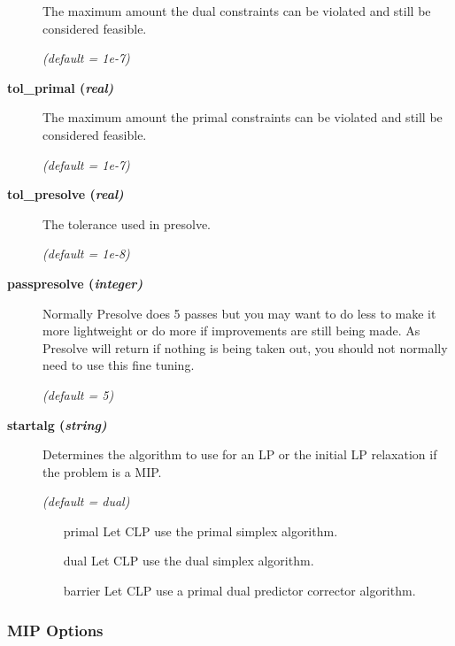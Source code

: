 \begin{description}
The maximum amount the dual constraints can be violated and still be considered feasible.

\textsl{(default = 1e-7)}

\item[\label{tol_primal}\hypertarget{tol_primal}
{\textbf{tol\_primal (\slshape{real})}}]\hspace{1.0in}

The maximum amount the primal constraints can be violated and still be considered feasible.

\textsl{(default = 1e-7)}

\item[\label{tol_presolve}\hypertarget{tol_presolve}
{\textbf{tol\_presolve (\slshape{real})}}]\hspace{1.0in}

The tolerance used in presolve.

\textsl{(default = 1e-8)}

\item[\label{passpresolve}\hypertarget{passpresolve}
{\textbf{passpresolve (\slshape{integer})}}]\hspace{1.0in}

Normally Presolve does 5 passes but you may want to do less to make
it more lightweight or do more if improvements are still being made.
As Presolve will return if nothing is being taken out, you should
not normally need to use this fine tuning.

\textsl{(default = 5)}

\item[\label{startalg}\hypertarget{startalg}
{\textbf{startalg (\slshape{string})}}]\hspace{1.0in}

Determines the algorithm to use for an LP or the initial LP relaxation if the problem is a MIP.

\textsl{(default = dual)}
\begin{itemize}
\item[primal] 
Let CLP use the primal simplex algorithm.
\item[dual] 
Let CLP use the dual simplex algorithm.
\item[barrier] 
Let CLP use a primal dual predictor corrector algorithm.
\end{itemize}

\end{description}

\subsubsection{MIP Options}

